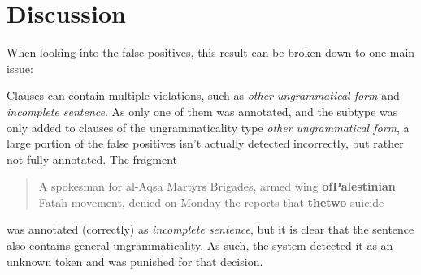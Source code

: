 \documentclass[a4paper,10pt]{scrartcl}
\begin{document}

\section{Discussion}

When looking into the false positives, this result can be broken down to one main issue:

Clauses can contain multiple violations, such as \textit{other ungrammatical form} and \textit{incomplete sentence}. As only one of them was annotated, and the subtype was only added to clauses of the ungrammaticality type \textit{other ungrammatical form}, a large portion of the false positives isn't actually detected incorrectly, but rather not fully annotated. The fragment

\begin{quote}
	A spokesman for al-Aqsa Martyrs Brigades, armed wing \textbf{ofPalestinian}\\
	Fatah movement, denied on Monday the reports that \textbf{thetwo} suicide
\end{quote}

was annotated (correctly) as \textit{incomplete sentence}, but it is clear that the sentence also contains general ungrammaticality. As such, the system detected it as an unknown token and was punished for that decision.
\newpage










\end{document}

